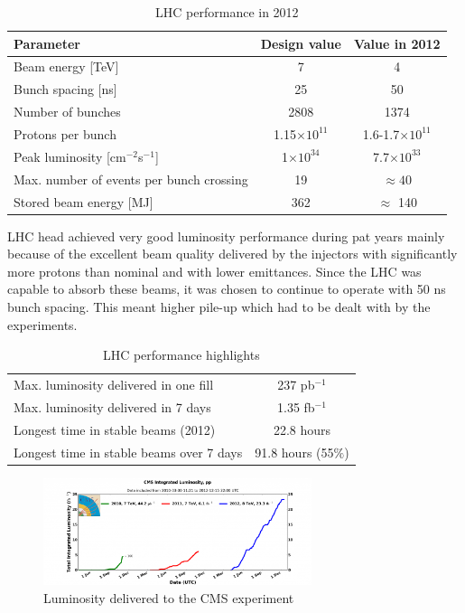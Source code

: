 \begin{table}[h]
\centering
  \caption{LHC performance in 2012}
  \begin{tabular}{ l  c  c }
      \hline
      \hline
      Parameter & Design value & Value in 2012 \\
      \hline
      Beam energy [TeV] & 7 & 4 \\
      Bunch spacing [ns] & 25 & 50 \\
      Number of bunches & 2808 & 1374 \\
      Protons per bunch & 1.15$\times 10^{11}$ & 1.6-1.7$\times 10^{11}$ \\
      Peak luminosity [cm$^{-2}$s$^{-1}$] & 1$\times 10^{34}$ & 7.7$\times 10^{33}$ \\
      Max. number of events per bunch crossing & 19 & $\approx 40$ \\
      Stored beam energy [MJ] & 362 & $\approx$ 140 \\
      \hline
      \hline 
  \end{tabular}
\end{table}

LHC head achieved very good luminosity performance during pat years mainly because of the excellent beam quality delivered by the injectors with significantly more protons than nominal and with lower emittances. Since the LHC was capable to absorb these beams, it was chosen to continue to operate with 50 ns bunch spacing. This meant higher pile-up which had to be dealt with by the experiments. 


\begin{table}[h]
\centering
  \caption{LHC performance highlights}
  \begin{tabular}{ l  c }
      \hline
      \hline
      Max. luminosity delivered in one fill & 237 pb$^{-1}$  \\
      Max. luminosity delivered in 7 days & 1.35 fb$^{-1}$  \\
      Longest time in stable beams (2012) & 22.8 hours \\
      Longest time in stable beams over 7 days & 91.8 hours (55$\%$) \\
      \hline
      \hline 
  \end{tabular}
\end{table}

\begin{figure}[htbp]
	\centering
		\includegraphics[width=0.7\textwidth]{Figures/lumi.png}
	\caption[Luminosity delivered to the CMS experiment]{Luminosity delivered to the CMS experiment}
	\label{fig:LHC_lumi}
\end{figure}
 
